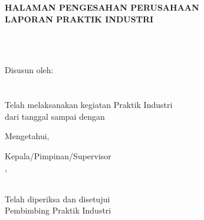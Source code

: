 \newpage

\begin{center}
    \begin{doublespace}
        \textbf{\large \MakeUppercase{Halaman Pengesahan  Perusahaan\\ Laporan Praktik Industri}}
    \end{doublespace}
\end{center}

\begin{center}
    \textbf{\normalsize \MakeUppercase {\judulid}} \\
    \textbf{\normalsize \MakeUppercase {\tempat}} \\ [5cm]
\end{center}

\begin{center}
    Disusun oleh:\\
    \textbf{\underline{\penulis}}\\
    \textbf{\nim}\\[4cm]

    Telah melaksanakan kegiatan Praktik Industri \\
    dari tanggal \textbf{\tglMulai} sampai dengan \textbf{\tglSelesai} \\ [2cm]
\end{center}

\begin{center}
    Mengetahui, \\[1cm]
\end{center}
\begin{minipage}{0.45\textwidth}
    Kepala/Pimpinan/Supervisor\\
    \tempat,\\[2cm]
    \underline{\pimpinanPerusahaan}\\
    \jabatanPimpinan
\end{minipage}%
\hfill
 \begin{minipage}{0.35\textwidth}
    Telah diperiksa dan disetujui \\
    Pembimbing Praktik Industri\\[2cm]
    \underline{\pembimbingPerusahaan}\\
    \jabatanPembimbing
\end{minipage}
